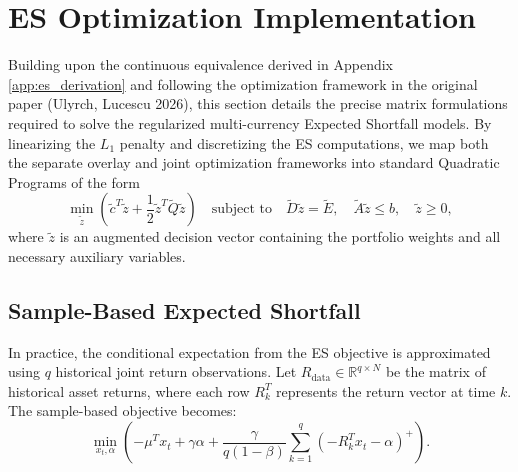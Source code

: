 \chapter{ES Optimization Implementation} \label{app:qp_formulations}

Building upon the continuous equivalence derived in Appendix \ref{app:es_derivation} and following the optimization framework in the original paper (Ulyrch, Lucescu 2026), this section details the precise matrix formulations required to solve the regularized multi-currency Expected Shortfall models. By linearizing the $L_1$ penalty and discretizing the ES computations, we map both the separate overlay and joint optimization frameworks into standard Quadratic Programs of the form
\begin{equation} \label{eq:standard_qp}
    \min_{\tilde{z}} \left( \tilde{c}^T \tilde{z} + \frac{1}{2} \tilde{z}^T \tilde{Q} \tilde{z} \right) \quad \text{subject to} \quad \tilde{D} \tilde{z} = \tilde{E}, \quad \tilde{A} \tilde{z} \le b, \quad \tilde{z} \ge 0,
\end{equation}
where $\tilde{z}$ is an augmented decision vector containing the portfolio weights and all necessary auxiliary variables.

\section{Sample-Based Expected Shortfall}

In practice, the conditional expectation from the ES objective is approximated using $q$ historical joint return observations. Let $R_{\text{data}} \in \mathbb{R}^{q \times N}$ be the matrix of historical asset returns, where each row $R_k^T$ represents the return vector at time $k$. The sample-based objective becomes:
\begin{equation*}
    \min_{x_t, \alpha} \left( - \mu^T x_t + \gamma \alpha + \frac{\gamma}{q(1-\beta)} \sum_{k=1}^q (-R_k^T x_t - \alpha)^+ \right).
\end{equation*}

